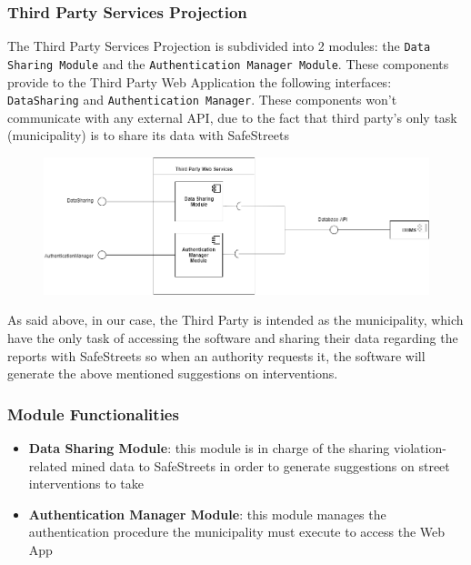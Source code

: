 \documentclass[12pt,a4paper]{article}
\begin{document}
\subsubsection{Third Party Services Projection}
The Third Party Services Projection is subdivided into 2 modules: the \texttt{Data Sharing Module} and the \texttt{Authentication Manager Module}. These components provide to the Third Party Web Application the following interfaces: \texttt{DataSharing} and \texttt{Authentication Manager}. These components won't communicate with any external API, due to the fact that third party's only task (municipality) is to share its data with SafeStreets
\begin{figure}[H]
		\centering
		\includegraphics[width=1.2\linewidth]{../assets/images/THIRD PARTY PROJECTION.png}
	\end{figure}
As said above, in our case, the Third Party is intended as the municipality, which have the only task of accessing the software and sharing their data regarding the reports with SafeStreets so when an authority requests it, the software will generate the above mentioned suggestions on interventions.
\subsubsection*{Module Functionalities}
\begin{itemize}
\item \textbf{Data Sharing Module}: this module is in charge of the sharing violation-related mined data to SafeStreets in order to generate suggestions on street interventions to take
\item \textbf{Authentication Manager Module}: this module manages the authentication procedure the municipality must execute to access the Web App
\end{itemize}
\newpage
\end{document}
